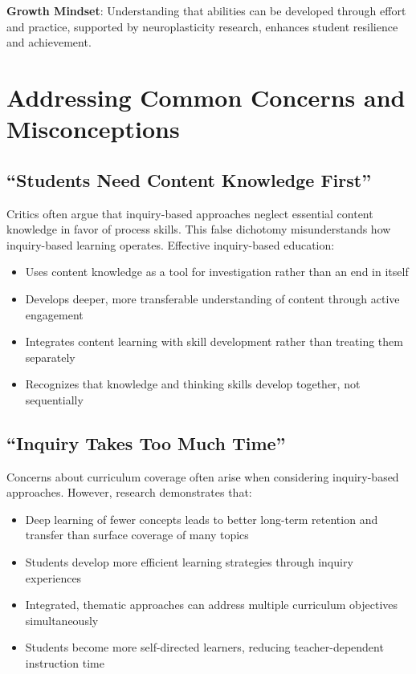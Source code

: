 \documentclass[
  Letterpaper,
]{scrbook}
\providecommand{\tightlist}{%
  \setlength{\itemsep}{0pt}\setlength{\parskip}{0pt}}\usepackage{longtable,booktabs,array}
\begin{document}
\textbf{Growth Mindset}: Understanding that abilities can be developed
through effort and practice, supported by neuroplasticity research,
enhances student resilience and achievement.

\section{Addressing Common Concerns and
Misconceptions}\label{addressing-common-concerns-and-misconceptions}

\subsection{``Students Need Content Knowledge
First''}\label{students-need-content-knowledge-first}

Critics often argue that inquiry-based approaches neglect essential
content knowledge in favor of process skills. This false dichotomy
misunderstands how inquiry-based learning operates. Effective
inquiry-based education:

\begin{itemize}
\tightlist
\item
  Uses content knowledge as a tool for investigation rather than an end
  in itself
\item
  Develops deeper, more transferable understanding of content through
  active engagement
\item
  Integrates content learning with skill development rather than
  treating them separately
\item
  Recognizes that knowledge and thinking skills develop together, not
  sequentially
\end{itemize}

\subsection{``Inquiry Takes Too Much
Time''}\label{inquiry-takes-too-much-time}

Concerns about curriculum coverage often arise when considering
inquiry-based approaches. However, research demonstrates that:

\begin{itemize}
\tightlist
\item
  Deep learning of fewer concepts leads to better long-term retention
  and transfer than surface coverage of many topics
\item
  Students develop more efficient learning strategies through inquiry
  experiences
\item
  Integrated, thematic approaches can address multiple curriculum
  objectives simultaneously
\item
  Students become more self-directed learners, reducing
  teacher-dependent instruction time
\end{itemize}
\end{document}
